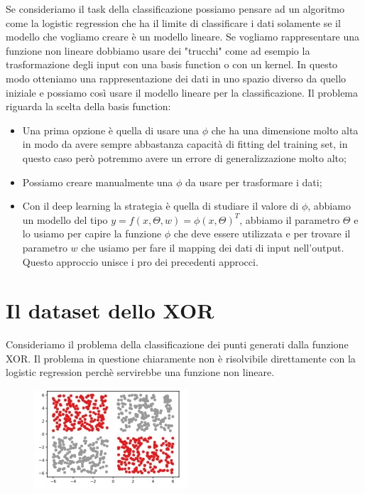\documentclass[14pt]{extreport}
\begin{document}
Se consideriamo il task della classificazione possiamo pensare ad un algoritmo come la logistic regression che ha il limite di classificare i dati
solamente se il modello che vogliamo creare è un modello lineare. Se vogliamo rappresentare una funzione non lineare dobbiamo usare dei "trucchi" come
ad esempio la trasformazione degli input con una basis function o con un kernel. In questo modo otteniamo una rappresentazione dei dati in uno spazio
diverso da quello iniziale e possiamo così usare il modello lineare per la classificazione. Il problema riguarda la scelta della basis function:
\begin{itemize}
	\item Una prima opzione è quella di usare una $\phi$ che ha una dimensione molto alta in modo da avere sempre abbastanza capacità di fitting del
	      training set, in questo caso però potremmo avere un errore di generalizzazione molto alto;
	\item Possiamo creare manualmente una $\phi$ da usare per trasformare i dati;
	\item Con il deep learning la strategia è quella di studiare il valore di $\phi$, abbiamo un modello del tipo $y = f(x, \Theta, w) = \phi(x,
		      \Theta)^T$, abbiamo il parametro $\Theta$ e lo usiamo per capire la funzione $\phi$ che deve essere utilizzata e per trovare il
		      parametro $w$ che usiamo per fare il mapping dei dati di input nell'output. Questo approccio unisce i pro dei precedenti approcci.
\end{itemize}


\section{Il dataset dello XOR}

Consideriamo il problema della classificazione dei punti generati dalla funzione XOR. Il problema in questione chiaramente non è risolvibile
direttamente con la logistic regression perchè servirebbe una funzione non lineare.

\begin{figure}[H]
	\centering
	\includegraphics[width=0.7\linewidth]{355.jpeg}
\end{figure}
\end{document}
